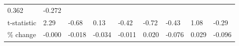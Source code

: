 \documentclass[
]{book}
\begin{document}
\begin{longtable}[]{@{}lllllllll@{}}
\begin{minipage}[t]{0.07\columnwidth}
0.362\strut
\end{minipage} & \begin{minipage}[t]{0.10\columnwidth}\raggedright
-0.272\strut
\end{minipage}\tabularnewline
\begin{minipage}[t]{0.10\columnwidth}\raggedright
t-statistic\strut
\end{minipage} & \begin{minipage}[t]{0.08\columnwidth}\raggedright
2.29\strut
\end{minipage} & \begin{minipage}[t]{0.09\columnwidth}\raggedright
-0.68\strut
\end{minipage} & \begin{minipage}[t]{0.07\columnwidth}\raggedright
0.13\strut
\end{minipage} & \begin{minipage}[t]{0.06\columnwidth}\raggedright
-0.42\strut
\end{minipage} & \begin{minipage}[t]{0.11\columnwidth}\raggedright
-0.72\strut
\end{minipage} & \begin{minipage}[t]{0.07\columnwidth}\raggedright
-0.43\strut
\end{minipage} & \begin{minipage}[t]{0.07\columnwidth}\raggedright
1.08\strut
\end{minipage} & \begin{minipage}[t]{0.10\columnwidth}\raggedright
-0.29\strut
\end{minipage}\tabularnewline
\begin{minipage}[t]{0.10\columnwidth}\raggedright
\% change\strut
\end{minipage} & \begin{minipage}[t]{0.08\columnwidth}\raggedright
-0.000\strut
\end{minipage} & \begin{minipage}[t]{0.09\columnwidth}\raggedright
-0.018\strut
\end{minipage} & \begin{minipage}[t]{0.07\columnwidth}\raggedright
-0.034\strut
\end{minipage} & \begin{minipage}[t]{0.06\columnwidth}\raggedright
-0.011\strut
\end{minipage} & \begin{minipage}[t]{0.11\columnwidth}\raggedright
0.020\strut
\end{minipage} & \begin{minipage}[t]{0.07\columnwidth}\raggedright
-0.076\strut
\end{minipage} & \begin{minipage}[t]{0.07\columnwidth}\raggedright
0.029\strut
\end{minipage} & \begin{minipage}[t]{0.10\columnwidth}\raggedright
-0.096\strut
\end{minipage}\tabularnewline
\bottomrule
\end{longtable}
\end{document}
